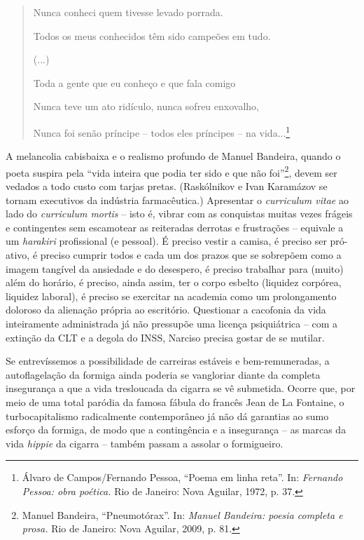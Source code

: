 \begin{quote}
Nunca conheci quem tivesse levado porrada.

Todos os meus conhecidos têm sido campeões em tudo.

(...)

Toda a gente que eu conheço e que fala comigo

Nunca teve um ato ridículo, nunca sofreu enxovalho,

Nunca foi senão príncipe -- todos eles príncipes -- na vida...\footnote{Álvaro
  de Campos/Fernando Pessoa, ``Poema em linha reta''. In: \emph{Fernando
  Pessoa: obra poética.} Rio de Janeiro: Nova Aguilar, 1972, p. 37.}
\end{quote}

A melancolia cabisbaixa e o realismo profundo de Manuel Bandeira, quando
o poeta suspira pela ``vida inteira que podia ter sido e que não
foi''\footnote{Manuel Bandeira, ``Pneumotórax''. In: \emph{Manuel
  Bandeira: poesia completa e prosa.} Rio de Janeiro: Nova Aguilar,
  2009, p. 81.}, devem ser vedados a todo custo com tarjas pretas.
(Raskólnikov e Ivan Karamázov se tornam executivos da indústria
farmacêutica.) Apresentar o \emph{curriculum vitae} ao lado do
\emph{curriculum mortis} -- isto é, vibrar com as conquistas muitas
vezes frágeis e contingentes sem escamotear as reiteradas derrotas e
frustrações -- equivale a um \emph{harakiri} profissional (e pessoal). É
preciso vestir a camisa, é preciso ser pró-ativo, é preciso cumprir
todos e cada um dos prazos que se sobrepõem como a imagem tangível da
ansiedade e do desespero, é preciso trabalhar para (muito) além do
horário, é preciso, ainda assim, ter o corpo esbelto (liquidez corpórea,
liquidez laboral), é preciso se exercitar na academia como um
prolongamento doloroso da alienação própria ao escritório. Questionar a
cacofonia da vida inteiramente administrada já não pressupõe uma licença
psiquiátrica -- com a extinção da CLT e a degola do INSS, Narciso
precisa gostar de se mutilar.

Se entrevíssemos a possibilidade de carreiras estáveis e
bem-remuneradas, a autoflagelação da formiga ainda poderia se vangloriar
diante da completa insegurança a que a vida tresloucada da cigarra se vê
submetida. Ocorre que, por meio de uma total paródia da famosa fábula do
francês Jean de La Fontaine, o turbocapitalismo radicalmente
contemporâneo já não dá garantias ao sumo esforço da formiga, de modo
que a contingência e a insegurança -- as marcas da vida \emph{hippie} da
cigarra -- também passam a assolar o formigueiro.

